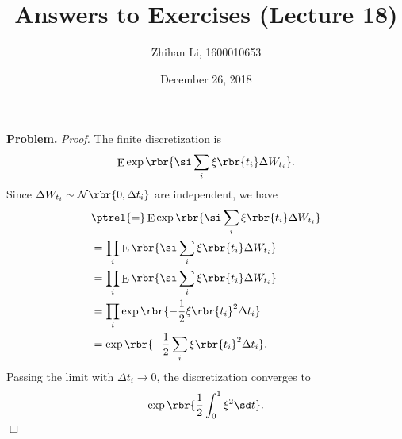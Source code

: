 \documentclass[english, nochinese]{pnote}
\title{Answers to Exercises (Lecture 18)}
\author{Zhihan Li, 1600010653}
\date{December 26, 2018}
\DeclareMathOperator\ope{\mathrm{E}}
\begin{document}
\maketitle

\textbf{Problem.} \textit{Proof.} The finite discretization is
\begin{equation}
\ope \exp \rbr{ \si \sum_i \xi \rbr{t_i} \Delta W_{t_i} } .
\end{equation}
Since $ \Delta W_{t_i} \sim \mathcal{N} \rbr{ 0, \Delta t_i } $ are independent, we have
\begin{equation}
\begin{split}
&\ptrel{=} \ope \exp \rbr{ \si \sum_i \xi \rbr{t_i} \Delta W_{t_i} } \\
&= \prod_i \ope \rbr{ \si \sum_i \xi \rbr{t_i} \Delta W_{t_i} } \\
&= \prod_i \ope \rbr{ \si \sum_i \xi \rbr{t_i} \Delta W_{t_i} } \\
&= \prod_i \exp \rbr{ -\frac{1}{2} \xi \rbr{t_i}^2 \Delta t_i } \\
&= \exp \rbr{ -\frac{1}{2} \sum_i \xi \rbr{t_i}^2 \Delta t_i }.
\end{split}
\end{equation}
Passing the limit with $ \Delta t_i \rightarrow 0 $, the discretization converges to
\begin{equation}
\exp \rbr{ \frac{1}{2} \int_0^1 \xi^2 \sd t }.
\end{equation}
\hfill$\Box$
\end{document}
